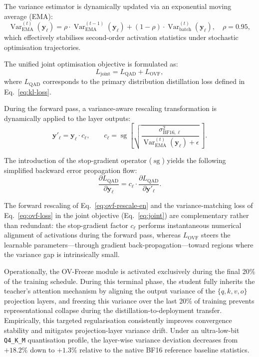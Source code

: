 \documentclass[a4paper,fleqn]{cas-sc}
\begin{document}
The variance estimator is dynamically updated via an exponential moving average (EMA):
\begin{equation}
\label{eq:ema}
\operatorname{Var}^{(t)}_{\mathrm{EMA}}(\bm{y}_\ell)
= \rho \cdot \operatorname{Var}^{(t-1)}_{\mathrm{EMA}}(\bm{y}_\ell)
+ (1-\rho) \cdot \operatorname{Var}^{(t)}_{\mathrm{batch}}(\bm{y}_\ell),
\quad \rho = 0.95,
\end{equation}
which effectively stabilises second-order activation statistics under stochastic optimisation trajectories.

The unified joint optimisation objective is formulated as:
\begin{equation}
\label{eq:joint}
L_{\mathrm{joint}} = L_{\mathrm{QAD}} + L_{\mathrm{OVF}},
\end{equation}
where $L_{\mathrm{QAD}}$ corresponds to the primary distribution distillation loss defined in Eq.~\eqref{eq:kl-loss}.

During the forward pass, a variance-aware rescaling transformation is dynamically applied to the layer outputs:
\begin{equation}
\label{eq:ovf-rescale-en}
\bm{y}'_\ell = \bm{y}_\ell \cdot c_\ell, \qquad
c_\ell = \operatorname{sg}\!\left[\sqrt{\frac{\sigma^2_{\mathrm{BF16},\ell}}{\operatorname{Var}^{(t)}_{\mathrm{EMA}}(\bm{y}_\ell) + \epsilon}}\,\right].
\end{equation}

The introduction of the stop-gradient operator ($\operatorname{sg}$) yields the following simplified backward error propagation flow:
\begin{equation}
\label{eq:ovf-detach-en}
\frac{\partial L_{\mathrm{QAD}}}{\partial\bm{y}_\ell}
= c_\ell \cdot \frac{\partial L_{\mathrm{QAD}}}{\partial\bm{y}'_\ell}.
\end{equation}

The forward rescaling of Eq.~\eqref{eq:ovf-rescale-en} and the variance-matching loss of Eq.~\eqref{eq:ovf-loss} in the joint objective (Eq.~\eqref{eq:joint}) are complementary rather than redundant: the stop-gradient factor $c_\ell$ performs instantaneous numerical alignment of activations during the forward pass, whereas $L_{\mathrm{OVF}}$ steers the learnable parameters---through gradient back-propagation---toward regions where the variance gap is intrinsically small.

Operationally, the OV-Freeze module is activated exclusively during the final 20\% of the training schedule. During this terminal phase, the student fully inherits the teacher's attention mechanism by aligning the output variance of the $\{q,k,v,o\}$ projection layers, and freezing this variance over the last 20\% of training prevents representational collapse during the distillation-to-deployment transfer. Empirically, this targeted regularisation consistently improves convergence stability and mitigates projection-layer variance drift. Under an ultra-low-bit \texttt{Q4\_K\_M} quantisation profile, the layer-wise variance deviation decreases from $+18.2\%$ down to $+1.3\%$ relative to the native BF16 reference baseline statistics.
\end{document}
